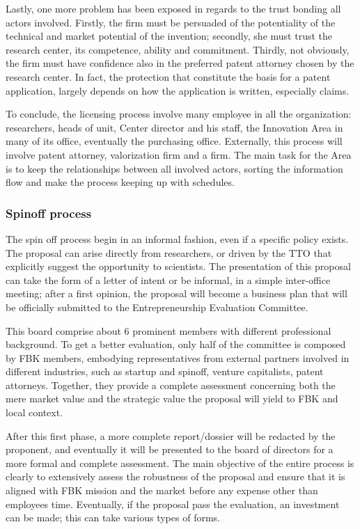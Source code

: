 Lastly, one more problem has been exposed in regards to the trust bonding all actors involved. Firstly, the firm must be persuaded of the potentiality of the technical and market potential of the invention; secondly, she must trust the research center, its competence, ability and commitment. Thirdly, not obviously, the firm must have confidence also in the preferred patent attorney chosen by the research center. In fact, the protection that constitute the basis for a patent application, largely depends on how the application is written, especially claims.

To conclude, the licensing process involve many employee in all the organization: researchers, heads of unit, Center director and his staff, the Innovation Area in many of its office, eventually the purchasing office. Externally, this process will involve patent attorney, valorization firm and a firm. The main task for the Area is to keep the relationships between all involved actors, sorting the information flow and make the process keeping up with schedules.

\subsubsection{Spinoff process}

The spin off process begin in an informal fashion, even if a specific policy exists. The proposal can arise directly from researchers, or driven by the TTO that explicitly suggest the opportunity to scientists. The presentation of this proposal can take the form of a letter of intent or be informal, in a simple inter-office meeting; after a first opinion, the proposal will become a business plan that will be officially submitted to the Entrepreneurship Evaluation Committee. 

This board comprise about 6 prominent members with different professional background. To get a better evaluation, only half of the committee is composed by FBK members, embodying representatives from external partners involved in different industries, such as startup and spinoff, venture capitalists, patent attorneys. Together, they provide a complete assessment concerning both the mere market value and the strategic value the proposal will yield to FBK and local context.

After this first phase, a more complete report/dossier will be redacted by the proponent, and eventually it will be presented to the board of directors for a more formal and complete assessment. The main objective of the entire process is clearly to extensively assess the robustness of the proposal and ensure that it is aligned with FBK mission and the market before any expense other than employees time. Eventually, if the proposal pass the evaluation, an investment can be made; this can take various types of forms.


